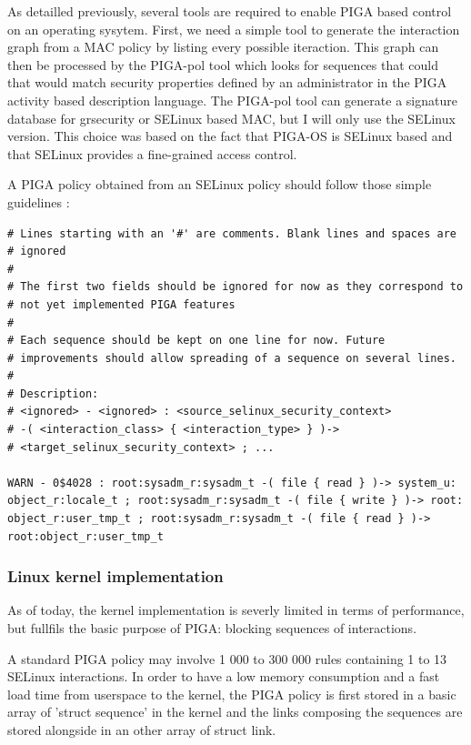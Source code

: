 \documentclass[pdftex,a4paper,titlepage,11pt]{article}
\begin{document}
As detailled previously, several tools are required to enable PIGA based control
on an operating sysytem. First, we need a simple tool to generate the
interaction graph from a MAC policy by listing every possible iteraction. This
graph can then be processed by the PIGA-pol tool which looks for sequences that
could that would match security properties defined by an administrator in the
PIGA activity based description language. The PIGA-pol tool can generate a
signature database for grsecurity or SELinux based MAC, but I will only use the
SELinux version. This choice was based on the fact that PIGA-OS is SELinux based
and that SELinux provides a fine-grained access control.

A PIGA policy obtained from an SELinux policy should follow those simple
guidelines :

\begin{lstlisting}
# Lines starting with an '#' are comments. Blank lines and spaces are
# ignored
#
# The first two fields should be ignored for now as they correspond to
# not yet implemented PIGA features
#
# Each sequence should be kept on one line for now. Future
# improvements should allow spreading of a sequence on several lines.
#
# Description:
# <ignored> - <ignored> : <source_selinux_security_context>
# -( <interaction_class> { <interaction_type> } )->
# <target_selinux_security_context> ; ...

WARN - 0$4028 : root:sysadm_r:sysadm_t -( file { read } )-> system_u:
object_r:locale_t ; root:sysadm_r:sysadm_t -( file { write } )-> root:
object_r:user_tmp_t ; root:sysadm_r:sysadm_t -( file { read } )->
root:object_r:user_tmp_t
\end{lstlisting}

\subsubsection{Linux kernel implementation}

As of today, the kernel implementation is severly limited in terms of
performance, but fullfils the basic purpose of PIGA: blocking sequences of
interactions.

\bigskip

A standard PIGA policy may involve 1 000 to 300 000 rules containing 1 to 13
SELinux interactions. In order to have a low memory consumption and a fast
load time from userspace to the kernel, the PIGA policy is first stored in a
basic array of 'struct sequence' in the kernel and the links composing the
sequences are stored alongside in an other array of struct link.
\end{document}
